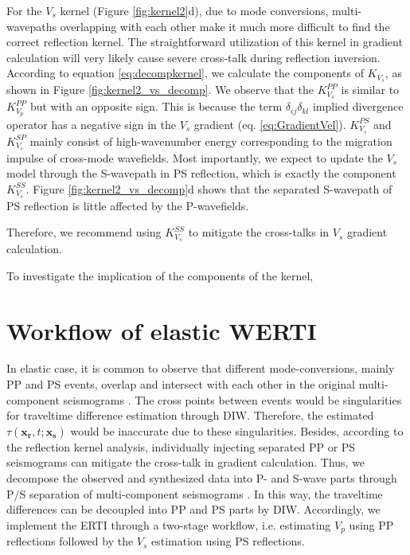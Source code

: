 For the $V_s$ kernel (Figure \ref{fig:kernel2}d), due to mode conversions, multi-wavepaths overlapping with each other 
make it much more difficult to find the correct reflection kernel. 
The straightforward utilization of this kernel in gradient calculation will very likely cause severe
cross-talk during reflection inversion.
According to equation
\eqref{eq:decompkernel}, we calculate the components of $K_{V_s}$, as shown in Figure
\ref{fig:kernel2_vs_decomp}. We observe that the $K^{PP}_{V_s}$ is similar to $K^{PP}_{V_p}$ but with an opposite
sign. This is because the term $\delta_{ij}\delta_{kl}$ implied divergence operator has
a negative sign in the $V_s$ gradient (eq. \eqref{eq:GradientVel}).
$K^{PS}_{V_s}$ and $K^{SP}_{V_s}$ mainly consist of high-wavenumber energy
corresponding to the migration impulse of cross-mode wavefields. Most importantly, 
we expect to update the $V_s$ model through the S-wavepath in PS reflection, which is
exactly the component $K^{SS}_{V_s}$.  Figure \ref{fig:kernel2_vs_decomp}d shows that the
separated S-wavepath of PS reflection is little affected by the P-wavefields. 
{\color{red}Therefore, we recommend using $K^{SS}_{V_s}$ to mitigate the cross-talks in $V_s$ gradient calculation.

To investigate the implication of the components of the kernel, }

\section{Workflow of elastic WERTI}
In elastic case, it is common to observe that different mode-conversions, mainly PP
and PS events, overlap and intersect with each other in the original multi-component
seismograms . The cross points between events
would be singularities for traveltime difference estimation through DIW.
Therefore, the estimated $\tau(\mathbf{x_r},t;\mathbf{x_s})$ would be inaccurate due
to these singularities.
Besides, according to the reflection kernel analysis, individually injecting separated
PP or PS seismograms
can mitigate the cross-talk in gradient calculation. 
Thus, we decompose the observed and synthesized data into P- and S-wave
parts through P/S separation of multi-component seismograms \cite[]{Li2016a}.
In this way, the traveltime differences can be decoupled into PP and
PS parts by DIW. Accordingly, we implement the ERTI through a two-stage
workflow, i.e. estimating $V_p$ using PP reflections followed by the $V_s$ estimation
using PS reflections.


